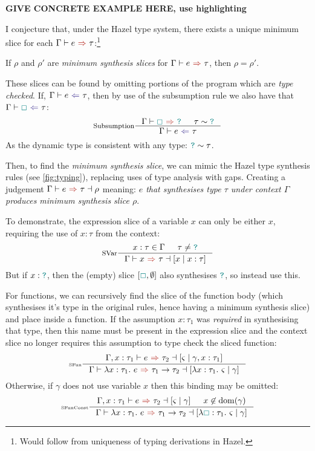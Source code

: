 \textbf{GIVE CONCRETE EXAMPLE HERE, use highlighting}

I conjecture that, under the Hazel type system, there exists a unique minimum slice for each $\synthesis{e}{\tau}$:\footnote{Would follow from uniqueness of typing derivations in Hazel.}
\begin{conjecture}[Uniqueness]\label{conj:SynthesisSliceUniqueness}
If $\rho$ and $\rho'$ are \textit{minimum synthesis slices} for $\synthesis{e}{\tau}$, then $\rho = \rho'$.
\end{conjecture}

These slices can be found by omitting portions of the program which are \textit{type checked}. If, $\analysis{e}{\tau}$, then by use of the subsumption rule we also have that $\analysis{\gap}{\tau}$:
\[\inference[Subsumption]{\synthesis{\gap}{\dyn} & \tau \sim \dyn}{\analysis{e}{\tau}}\] 
As the dynamic type is consistent with any type: ${\color{teal}\texttt{?}} \sim \tau$.

Then, to find the \textit{minimum synthesis slice}, we can mimic the Hazel type synthesis rules (see \cref{fig:typing}), replacing uses of type analysis with gaps. Creating a judgement $\synthesisslice{e}{\tau}{\rho}$ meaning: \textit{$e$ that synthesises type $\tau$ under context $\Gamma$ produces minimum synthesis slice $\rho$}.

To demonstrate, the expression slice of a variable $x$ can only be either $x$, requiring the use of $x : \tau$ from the context:
\[
\inference[SVar]{x : \tau \in \Gamma & \tau \neq \dyn}{\synthesisslice{x}{\tau}{[x\mid x:\tau]}}\]
But if $x : {\color{teal}\texttt{?}}$, then the (empty) slice $[{\color{teal}\Box}, \emptyset]$ also synthesises ${\color{teal}\texttt{?}}$, so instead use this. 

For functions, we can recursively find the slice of the function body (which synthesises it's type in the original rules, hence having a minimum synthesis slice) and place inside a function. 
If the assumption $x : \tau_1$ was \textit{required} in synthesising that type, then this name must be present in the expression slice and the context slice no longer requires this assumption to type check the sliced function:
\[\inference[\tiny SFun]{\synthesisslice[\Gamma,x:\tau_1]{e}{\tau_2}{[\varsigma \mid \gamma, x : \tau_1]} }{\synthesisslice{\lambda x:\tau_1.\ e}{\tau_1 \to \tau_2}{[\lambda x : \tau_1.\ \varsigma \mid \gamma]}}\]
Otherwise, if $\gamma$ does not use variable $x$ then this binding may be omitted:
\[\inference[\tiny SFunConst]{\synthesisslice[\Gamma,x:\tau_1]{e}{\tau_2}{[\varsigma \mid \gamma]} & x \not \in \mathrm{dom}(\gamma)}{\synthesisslice{\lambda x:\tau_1.\ e}{\tau_1 \to \tau_2}{[\lambda \gap : \tau_1.\ \varsigma \mid \gamma]}}\]

